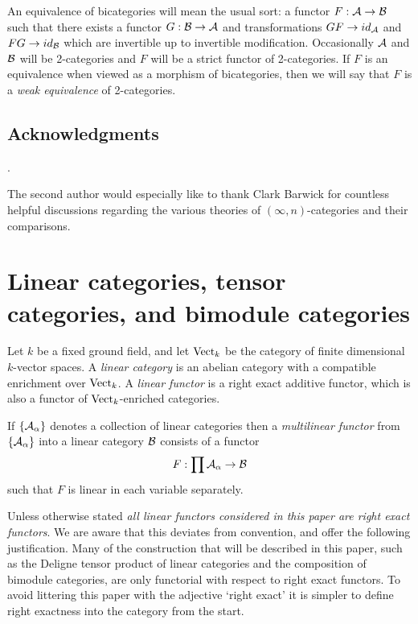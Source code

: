 \documentclass{amsart}
\begin{document}
An equivalence of bicategories will mean the usual sort: a functor $F: \mathcal A \to \mathcal B$ such that there exists a functor $G: \mathcal B \to \mathcal A$ and transformations $GF \to id_{\mathcal A}$ and $FG \to id_{\mathcal B}$ which are invertible up to invertible modification. Occasionally $\mathcal A$ and $\mathcal B$ will be 2-categories and $F$ will be a strict functor of 2-categories. If $F$ is an equivalence when viewed as a morphism of bicategories, then we will say that $F$ is a {\em weak equivalence} of 2-categories. 


\subsection*{Acknowledgments}.

The second author would especially like to thank Clark Barwick for countless helpful discussions regarding the various theories of $(\infty,n)$-categories and their comparisons. 

\section{Linear categories, tensor categories, and bimodule categories} \label{sec-tc-lincat}



	Let $k$ be a fixed ground field, and let $\mathrm{Vect}_k$ be the category of finite dimensional $k$-vector spaces.   A {\em linear category} is an abelian category with a compatible enrichment over ${\mathrm{Vect}}_k$.  A {\em linear functor} is a right exact additive functor, which is also a functor of ${\mathrm{Vect}}_k$-enriched categories. 
	
If $\{\mathcal A_\alpha\}$ denotes a collection of linear categories then a {\em multilinear functor} from $\{\mathcal A_\alpha\}$ into a linear category $\mathcal B$ consists of a functor
\begin{equation*}
	F: \prod \mathcal A_\alpha \to \mathcal B
\end{equation*}
such that $F$ is linear in each variable separately. 

\begin{warning}
	Unless otherwise stated {\em all linear functors considered in this paper are right exact functors}.  We are aware that this deviates from convention, and offer the following justification. Many of the construction that will be described in this paper, such as the Deligne tensor product of linear categories and the composition of bimodule categories, are only functorial with respect to right exact functors. To avoid littering this paper with the adjective `right exact' it is simpler to define right exactness into the category from the start.  
\end{warning} 
\end{document}
